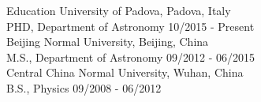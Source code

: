 \documentclass{resume} %
\begin{document}

\begin{rSection}{Education}
{University of Padova, Padova, Italy} \\
{PHD, Department of Astronomy} \hfill 10/2015 - Present\\

{Beijing Normal University, Beijing, China} \\
{M.S., Department of Astronomy} \hfill 09/2012 - 06/2015\\

{Central China Normal University, Wuhan, China }\\
{B.S., Physics}  \hfill 09/2008 - 06/2012\\

\end{rSection}

\end{document}
